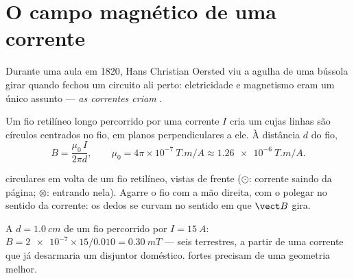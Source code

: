 \section{O campo magnético de uma corrente}

\begin{remark}[Oersted, 1820]\label{rem:g11:magnetic-fields:oersted}
Durante uma aula em 1820, Hans Christian Oersted viu a agulha de uma
bússola girar quando fechou um circuito ali perto: eletricidade e
magnetismo eram um único assunto --- \emph{as correntes criam }.
\end{remark}

\begin{proposition}\label{prop:g11:magnetic-fields:wire}
Um fio retilíneo longo percorrido por uma corrente $I$ cria um 
cujas linhas são círculos centrados no fio, em planos perpendiculares a
ele. À distância $d$ do fio,
\[
B = \frac{\mu_0\, I}{2\pi d},
\qquad \mu_0 = 4\pi\times 10^{-7}\ \unit{T.m/A} \approx \qty{1.26e-6}{T.m/A}.
\]
\end{proposition}
\admitted

\begin{omfigure}
\qquad\qquad
{}

{\small {} circulares em volta de um fio retilíneo, vistas
de frente ($\odot$: corrente saindo da página; $\otimes$: entrando
nela). Agarre o fio com a mão direita, com o polegar no sentido da
corrente: os dedos se curvam no sentido em que $\vect B$ gira.}
\end{omfigure}

\begin{example}\label{ex:g11:magnetic-fields:wire}
A $d = \qty{1.0}{cm}$ de um fio percorrido por $I = \qty{15}{A}$:
$B = \num{2e-7} \times 15 / 0.010 = \qty{0.30}{mT}$ --- seis 
terrestres, a partir de uma corrente que já desarmaria um disjuntor
doméstico.  fortes precisam de uma geometria melhor.
\end{example}

